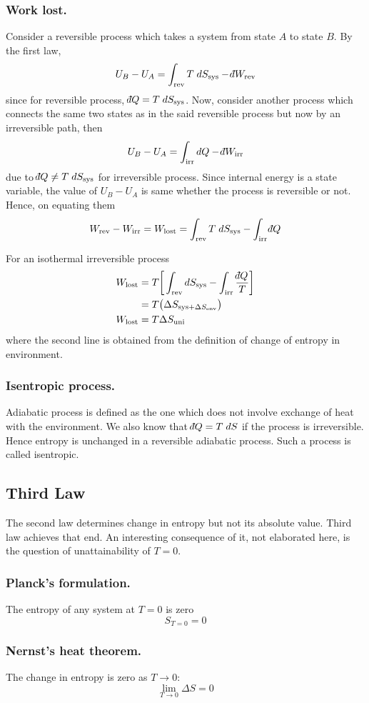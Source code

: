 \documentclass[../../../Main.tex]{subfiles}
\begin{document}
\subsubsection*{Work lost.} Consider a reversible process which takes a system from state $A$ to state $B$. By the first law, 
\begin{equation*}
    U_B-U_A=\int_{\text{rev}}T\;dS_{\text{sys}}-\dbar W_{\text{rev}}
\end{equation*}
since for reversible process, $\dbar Q=T\;dS_{\text{sys}}$. Now, consider another process which connects the same two states as in the said reversible process but now by an irreversible path, then
\begin{equation*}
    U_B-U_A=\int_{\text{irr}}dQ-\dbar W_{\text{irr}}
\end{equation*}
due to $\dbar Q\neq T\;dS_{\text{sys}}$ for irreversible process. Since internal energy is a state variable, the value of $U_B - U_A$ is same whether the process is reversible or not. Hence, on equating them 
\begin{equation*}
    W_{\text{rev}}-W_{\text{irr}}=W_{\text{lost}}= \int_{\text{rev}}T\;dS_{\text{sys}}-\int_{\text{irr}}\dbar Q
\end{equation*}

For an isothermal irreversible process
\begin{align*}
    W_{\text{lost}}&=T\bigg[ \int_{\text{rev}}dS_{\text{sys}}-\int_{\text{irr}}\frac{\dbar Q}{T} \bigg]\\
    &=T\big(\Delta S_{\text{sys}+\Delta S_{\text{env}}}\big)\\
    W_{\text{lost}}&=T\Delta S_\text{uni}
\end{align*}
where the second line is obtained from the definition of change of entropy in environment.

\subsubsection*{Isentropic process.} Adiabatic process is defined as the one which does not involve exchange of heat with the environment. We also know that $\dbar Q= T\; d S$ if the process is irreversible. Hence entropy is unchanged in a reversible adiabatic process. Such a process is called isentropic. 

\subsection*{Third Law}
The second law determines change in entropy but not its absolute value. Third law achieves that end. An interesting consequence of it, not elaborated here, is the question of unattainability of $T = 0$.

\subsubsection*{Planck’s formulation.} The entropy of any system at $T = 0$ is zero
\begin{equation*}
    S_{T=0}=0
\end{equation*}

\subsubsection*{Nernst’s heat theorem.} The change in entropy is zero as $T \rightarrow 0$:
\begin{equation*}
    \lim_{T\rightarrow0}\Delta S=0
\end{equation*}
\end{document}
